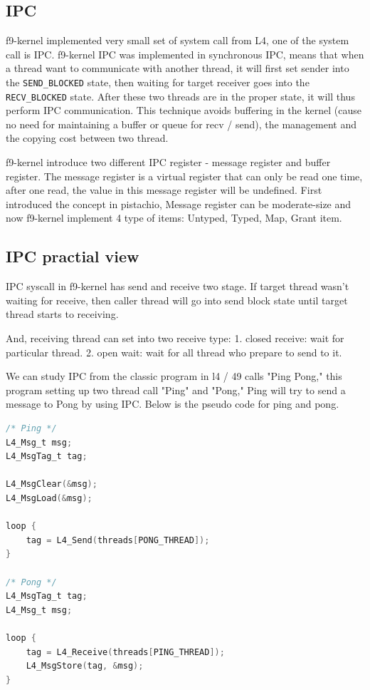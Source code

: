 \documentclass[10pt,preprint,nocopyrightspace]{sigplanconf}
\begin{document}
\subsection{IPC}

f9-kernel implemented very small set of system call from L4, one of the system call is IPC\cite{dannowski2011l4, arm2016svc}. f9-kernel IPC was implemented in synchronous IPC, means that when a thread want to communicate with another thread, it will first set sender into the \verb|SEND_BLOCKED| state, then waiting for target receiver goes into the \verb|RECV_BLOCKED| state. After these two threads are in the proper state, it will thus perform IPC communication. This technique avoids buffering in the kernel (cause no need for maintaining a buffer or queue for recv / send), the management and the copying cost between two thread.\cite{nourai2005aphysically}

f9-kernel introduce two different IPC register - message register and buffer register. The message register is a virtual register that can only be read one time, after one read, the value in this message register will be undefined. First introduced the concept in pistachio\cite{nourai2005aphysically}, Message register can be moderate-size and now f9-kernel implement 4 type of items: Untyped, Typed, Map, Grant item.

\subsection{IPC practial view}

IPC syscall in f9-kernel has send and receive two stage. If target thread wasn't waiting for receive, then caller thread will go into send block state until target thread starts to receiving.

And, receiving thread can set into two receive type: 1. closed receive: wait for particular thread. 2. open wait: wait for all thread who prepare to send to it.

We can study IPC from the classic program in l4 / 49 calls "Ping Pong," this program setting up two thread call "Ping" and "Pong," Ping will try to send a message to Pong by using IPC. Below is the pseudo code for ping and pong.

\begin{lstlisting}[language=c,frame=single,basicstyle=\small]
/* Ping */
L4_Msg_t msg;
L4_MsgTag_t tag;

L4_MsgClear(&msg);
L4_MsgLoad(&msg);

loop {
    tag = L4_Send(threads[PONG_THREAD]);
}

/* Pong */
L4_MsgTag_t tag;
L4_Msg_t msg;

loop {
    tag = L4_Receive(threads[PING_THREAD]);
    L4_MsgStore(tag, &msg);
}
\end{lstlisting}
\end{document}
